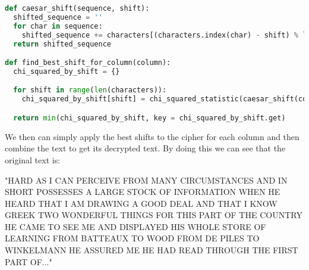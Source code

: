 \documentclass{article}
\begin{document}
\begin{lstlisting}[language=Python]
def caesar_shift(sequence, shift):
  shifted_sequence = ''
  for char in sequence:
    shifted_sequence += characters[(characters.index(char) - shift) % len(characters)]
  return shifted_sequence

def find_best_shift_for_column(column):
  chi_squared_by_shift = {}

  for shift in range(len(characters)):
    chi_squared_by_shift[shift] = chi_squared_statistic(caesar_shift(column, shift), english_letter_freq)

  return min(chi_squared_by_shift, key = chi_squared_by_shift.get)
\end{lstlisting}

We then can simply apply the best shifts to the cipher for each column and then combine the text to get its decrypted text. By doing this we can see that the original text is:

"HARD AS I CAN PERCEIVE FROM MANY CIRCUMSTANCES AND IN SHORT POSSESSES A LARGE STOCK OF INFORMATION WHEN HE HEARD THAT I AM DRAWING A GOOD DEAL AND THAT I KNOW GREEK TWO WONDERFUL THINGS FOR THIS PART OF THE COUNTRY HE CAME TO SEE ME AND DISPLAYED HIS WHOLE STORE OF LEARNING FROM BATTEAUX TO WOOD FROM DE PILES TO WINKELMANN HE ASSURED ME HE HAD READ THROUGH THE FIRST PART OF..."

\newpage
\printbibliography
\end{document}

